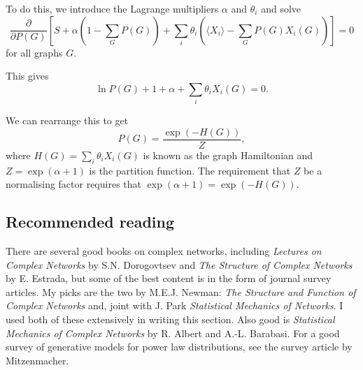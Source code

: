 To do this, we introduce the Lagrange multipliers $\alpha$ and $\theta_i$ and solve
$$
	\frac{\partial}{\partial P(G)}\left[S + \alpha \left(1-\sum_G P(G)\right) + \sum_i \theta_i \left(\langle X_i \rangle - \sum_G P(G)X_i(G)\right) \right] = 0
$$
for all graphs $G$.

This gives
$$
	\ln P(G) +1 +\alpha +\sum_i\theta_iX_i(G) = 0.
$$

We can rearrange this to get
$$
	P(G) = \frac{\exp(-H(G))}{Z},
$$
where $H(G) = \sum_i\theta_iX_i(G)$ is known as the graph Hamiltonian and $Z = \exp(\alpha+1)$ is the partition function. The requirement that $Z$ be a normalising factor requires that $\exp(\alpha+1) = \exp(-H(G))$.


\subsection{Recommended reading}
There are several good books on complex networks, including \emph{Lectures on Complex Networks} by S.N. Dorogovtsev and \emph{The Structure of Complex Networks} by E. Estrada, but some of the best content is in the form of journal survey articles. My picks are the two by M.E.J. Newman: \emph{The Structure and Function of Complex Networks} and, joint with J. Park \emph{Statistical Mechanics of Networks}. I used both of these extensively in writing this section. Also good is \emph{Statistical Mechanics of Complex Networks} by R. Albert and A.-L. Barabasi. For a good survey of generative models for power law distributions, see the survey article by Mitzenmacher.

